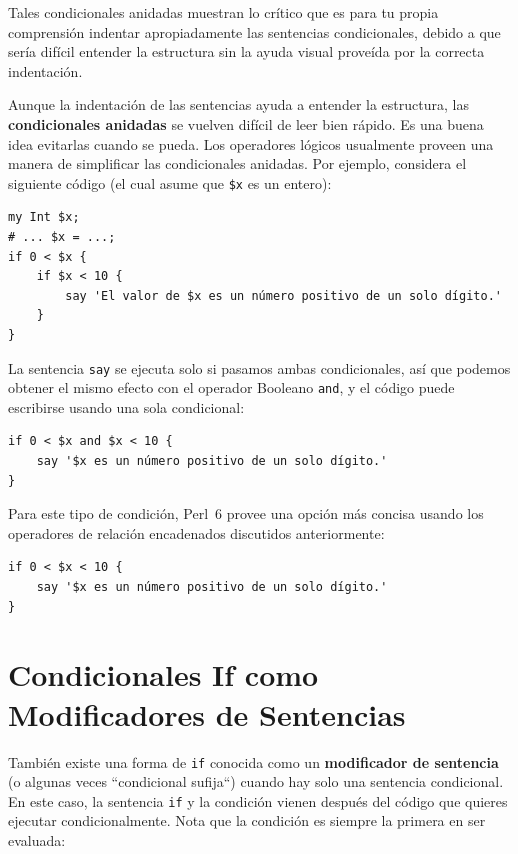 Tales condicionales anidadas muestran lo crítico que es 
para tu propia comprensión indentar apropiadamente las
sentencias condicionales, debido a que sería difícil 
entender la estructura sin la ayuda visual
proveída por la correcta indentación.

Aunque la indentación de las sentencias ayuda
a entender la estructura, las {\bf condicionales anidadas}
se vuelven difícil de leer bien rápido. Es una buena
idea evitarlas cuando se pueda. Los operadores lógicos
usualmente proveen una manera de simplificar las
condicionales anidadas. Por ejemplo, considera
el siguiente código (el cual asume que \verb|$x| es
un entero):

\begin{lstlisting}
my Int $x;
# ... $x = ...;
if 0 < $x {
    if $x < 10 {
        say 'El valor de $x es un número positivo de un solo dígito.'
    }
}
\end{lstlisting}
%
La sentencia {\tt say} se ejecuta solo si pasamos ambas condicionales,
así que podemos obtener el mismo efecto con el operador Booleano {\tt and},
y el código puede escribirse usando una sola condicional:

\begin{lstlisting}
if 0 < $x and $x < 10 {
    say '$x es un número positivo de un solo dígito.'
}
\end{lstlisting}

Para este tipo de condición, Perl~6 provee una opción más concisa
usando los operadores de relación encadenados discutidos 
anteriormente:

\begin{lstlisting}
if 0 < $x < 10 {
    say '$x es un número positivo de un solo dígito.'
}
\end{lstlisting}

\section{Condicionales If como Modificadores de Sentencias}
 
 

También existe una forma de {\tt if} conocida como un
{\bf modificador de sentencia} (o algunas veces ``condicional sufija``)
cuando hay solo una sentencia condicional. En este caso, 
la sentencia {\tt if} y la condición vienen después del 
código que quieres ejecutar condicionalmente. Nota que la 
condición es siempre la primera en ser evaluada:

